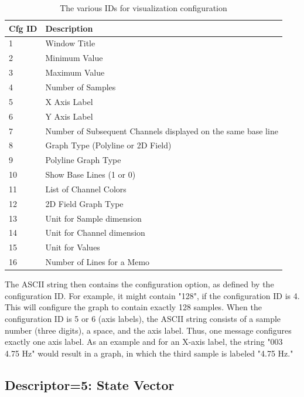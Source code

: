 \documentclass[letterpaper,oneside,12pt]{book}
\begin{document}
\begin{table}[ht]
 \centering
 \begin{tabular}{|l|l|}
  \hline
  \textbf{Cfg ID} & \textbf{Description} \\
  \hline
  1 & Window Title \\
  \hline
  2 & Minimum Value \\
  \hline
  3 & Maximum Value \\
  \hline
  4 & Number of Samples \\
  \hline
  5 & X Axis Label \\
  \hline
  6 & Y Axis Label \\
  \hline
  7 & Number of Subsequent Channels displayed on the same base line \\
  \hline
  8 & Graph Type (Polyline or 2D Field) \\
  \hline
  9 & Polyline Graph Type \\
  \hline
  10 & Show Base Lines (1 or 0) \\
  \hline
  11 & List of Channel Colors \\
  \hline
  12 & 2D Field Graph Type \\
  \hline
  13 & Unit for Sample dimension \\
  \hline
  14 & Unit for Channel dimension \\
  \hline
  15 & Unit for Values \\
  \hline
  16 & Number of Lines for a Memo \\
  \hline
 \end{tabular}
 \caption{The various IDs for visualization configuration}
 \label{tab:viscfg_table}
\end{table} 

The ASCII string then contains the configuration option, as defined by the 
configuration ID. For example, it might contain "128", if the configuration ID 
is 4. This will configure the graph to contain exactly 128 samples. When the 
configuration ID is 5 or 6 (axis labels), the ASCII string consists of a sample 
number (three digits), a space, and the axis label. Thus, one message configures 
exactly one axis label. As an example and for an X-axis label, the string "003 
4.75 Hz" would result in a graph, in which the third sample is labeled "4.75 
Hz."


\subsection{Descriptor=5: State Vector}
\label{statevector}
\end{document}
